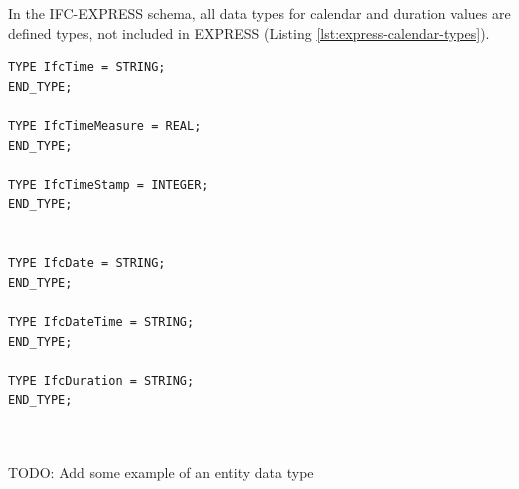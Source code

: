 




In the IFC-EXPRESS schema, all data types for calendar and duration values are defined types, not included in EXPRESS (Listing \ref{lst:express-calendar-types}).

\begin{lstlisting}[caption={Examples of calendar-related data types},label=lst:express-calendar-types]
TYPE IfcTime = STRING;
END_TYPE;

TYPE IfcTimeMeasure = REAL;
END_TYPE;

TYPE IfcTimeStamp = INTEGER;
END_TYPE;


TYPE IfcDate = STRING;
END_TYPE;

TYPE IfcDateTime = STRING;
END_TYPE;

TYPE IfcDuration = STRING;
END_TYPE;



\end{lstlisting}


TODO: Add some example of an entity data type


	
	
	
	
	











